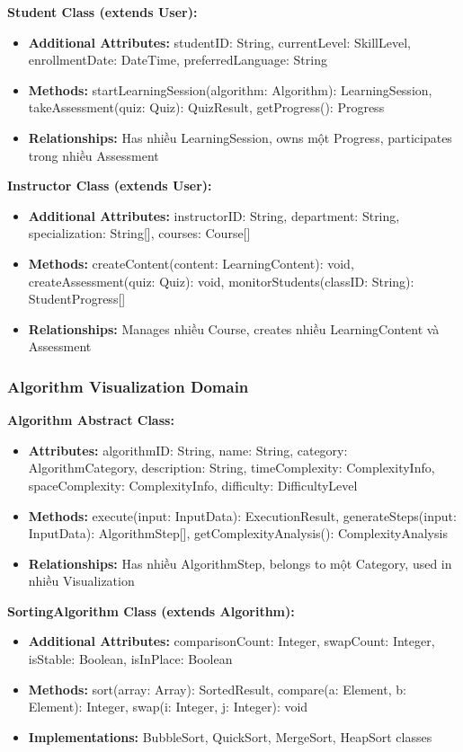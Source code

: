 \textbf{Student Class (extends User):}
\begin{itemize}
    \item \textbf{Additional Attributes:} studentID: String, currentLevel: SkillLevel, enrollmentDate: DateTime, preferredLanguage: String
    \item \textbf{Methods:} startLearningSession(algorithm: Algorithm): LearningSession, takeAssessment(quiz: Quiz): QuizResult, getProgress(): Progress
    \item \textbf{Relationships:} Has nhiều LearningSession, owns một Progress, participates trong nhiều Assessment
\end{itemize}

\textbf{Instructor Class (extends User):}
\begin{itemize}
    \item \textbf{Additional Attributes:} instructorID: String, department: String, specialization: String[], courses: Course[]
    \item \textbf{Methods:} createContent(content: LearningContent): void, createAssessment(quiz: Quiz): void, monitorStudents(classID: String): StudentProgress[]
    \item \textbf{Relationships:} Manages nhiều Course, creates nhiều LearningContent và Assessment
\end{itemize}

\subsubsection{Algorithm Visualization Domain}

\textbf{Algorithm Abstract Class:}
\begin{itemize}
    \item \textbf{Attributes:} algorithmID: String, name: String, category: AlgorithmCategory, description: String, timeComplexity: ComplexityInfo, spaceComplexity: ComplexityInfo, difficulty: DifficultyLevel
    \item \textbf{Methods:} execute(input: InputData): ExecutionResult, generateSteps(input: InputData): AlgorithmStep[], getComplexityAnalysis(): ComplexityAnalysis
    \item \textbf{Relationships:} Has nhiều AlgorithmStep, belongs to một Category, used in nhiều Visualization
\end{itemize}

\textbf{SortingAlgorithm Class (extends Algorithm):}
\begin{itemize}
    \item \textbf{Additional Attributes:} comparisonCount: Integer, swapCount: Integer, isStable: Boolean, isInPlace: Boolean
    \item \textbf{Methods:} sort(array: Array): SortedResult, compare(a: Element, b: Element): Integer, swap(i: Integer, j: Integer): void
    \item \textbf{Implementations:} BubbleSort, QuickSort, MergeSort, HeapSort classes
\end{itemize}

